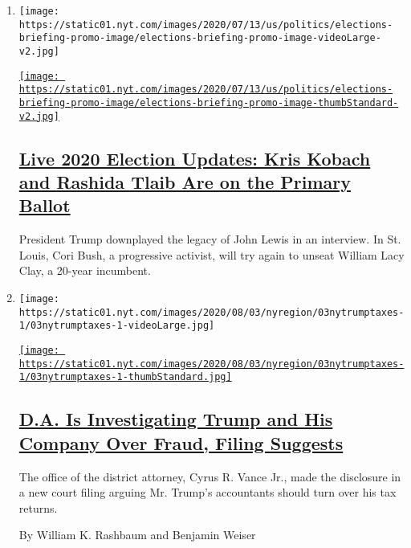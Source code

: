 \begin{enumerate}
\def\labelenumi{\arabic{enumi}.}
\item
  \texttt{[image: https://static01.nyt.com/images/2020/07/13/us/politics/elections-briefing-promo-image/elections-briefing-promo-image-videoLarge-v2.jpg]}

  \href{/2020/08/04/us/elections/primary-election-michigan-arizona-kansas.html}{\texttt{[image: https://static01.nyt.com/images/2020/07/13/us/politics/elections-briefing-promo-image/elections-briefing-promo-image-thumbStandard-v2.jpg]}}

  \hypertarget{live-2020-election-updates-kris-kobach-and-rashida-tlaib-are-on-the-primary-ballot}{%
  \subsection{\texorpdfstring{\href{/2020/08/04/us/elections/primary-election-michigan-arizona-kansas.html}{Live
  2020 Election Updates: Kris Kobach and Rashida Tlaib Are on the
  Primary
  Ballot}}{Live 2020 Election Updates: Kris Kobach and Rashida Tlaib Are on the Primary Ballot}}\label{live-2020-election-updates-kris-kobach-and-rashida-tlaib-are-on-the-primary-ballot}}

  President Trump downplayed the legacy of John Lewis in an interview.
  In St. Louis, Cori Bush, a progressive activist, will try again to
  unseat William Lacy Clay, a 20-year incumbent.
\item
  \texttt{[image: https://static01.nyt.com/images/2020/08/03/nyregion/03nytrumptaxes-1/03nytrumptaxes-1-videoLarge.jpg]}

  \href{/2020/08/03/nyregion/donald-trump-taxes-cyrus-vance.html}{\texttt{[image: https://static01.nyt.com/images/2020/08/03/nyregion/03nytrumptaxes-1/03nytrumptaxes-1-thumbStandard.jpg]}}

  \hypertarget{da-is-investigating-trump-and-his-company-over-fraud-filing-suggests}{%
  \subsection{\texorpdfstring{\href{/2020/08/03/nyregion/donald-trump-taxes-cyrus-vance.html}{D.A.
  Is Investigating Trump and His Company Over Fraud, Filing
  Suggests}}{D.A. Is Investigating Trump and His Company Over Fraud, Filing Suggests}}\label{da-is-investigating-trump-and-his-company-over-fraud-filing-suggests}}

  The office of the district attorney, Cyrus R. Vance Jr., made the
  disclosure in a new court filing arguing Mr. Trump's accountants
  should turn over his tax returns.

  By William K. Rashbaum and Benjamin Weiser
\end{enumerate}

